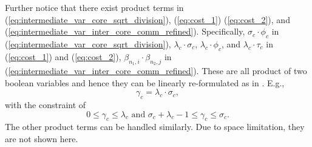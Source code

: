 Further notice that there exist product terms in (\ref{eq:intermediate_var_core_sqrt_division}), (\ref{eq:cost_1}) (\ref{eq:cost_2}), and (\ref{eq:intermediate_var_inter_core_comm_refined}). Specifically, $\sigma_c \cdot \phi_c$ in (\ref{eq:intermediate_var_core_sqrt_division}), $\lambda_c \cdot \sigma_c$, $\lambda_c \cdot \phi_c$, and $\lambda_c \cdot \tau_c$ in (\ref{eq:cost_1}) and (\ref{eq:cost_2}), $\beta_{n_1,i} \cdot \beta_{n_2,j}$ in (\ref{eq:intermediate_var_inter_core_comm_refined}). These are all product of two boolean variables and hence they can be linearly re-formulated as in \cite{wang:optimal}. E.g., 
%
\begin{equation} \label{eq:linearization_gamma_1}
\gamma_c = \lambda_c \cdot \sigma_c, 
\end{equation}
%
with the constraint of
%
\begin{equation} \label{eq:linearization_gamma_2}
0 \le \gamma_c \le \lambda_c \text{ and } \sigma_c + \lambda_c - 1 \le \gamma_c \le \sigma_c. 
\end{equation}
%
The other product terms can be handled similarly. Due to space limitation, they are not shown here.
%
%
%
%
%
%
%
%
%
%
%
%
%
%
%

